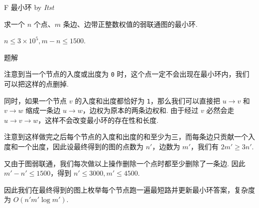\begin{frame}{F 最小环 {by \itshape Itst}}

	求一个 $n$ 个点、$m$ 条边、边带正整数权值的弱联通图的最小环.

	$n\le 3\times 10^5, m-n\le 1500$.

\end{frame}

\begin{frame}{题解}

	注意到当一个节点的入度或出度为 \texttt{0} 时，这个点一定不会出现在最小环内，我们可以把这样的点删掉.

	同时，如果一个节点 $v$ 的入度和出度都恰好为 \texttt{1}，那么我们可以直接把 $u\rightarrow v$ 和 $v\rightarrow w$ 缩成一条边 $u\rightarrow w$，边权为原本的两条边权和. 由于经过 $v$ 必然会走 $u\rightarrow v\rightarrow w$，这样不会改变最小环的存在性和长度.

	注意到这样做完之后每个节点的入度和出度的和至少为三，而每条边只贡献一个入度和一个出度，因此设最终得到的图的点数为 $n'$，边数为 $m'$，我们有 $2m'\ge 3n'$.

	又由于图弱联通，我们每次做以上操作删除一个点时都至少删除了一条边. 因此 $m'-n'\le 1500$，得到 $n'\le 3000, m'\le 4500$.

	因此我们在最终得到的图上枚举每个节点跑一遍最短路并更新最小环答案，复杂度为 $O(n'm'\log {m'})$.
\end{frame}
